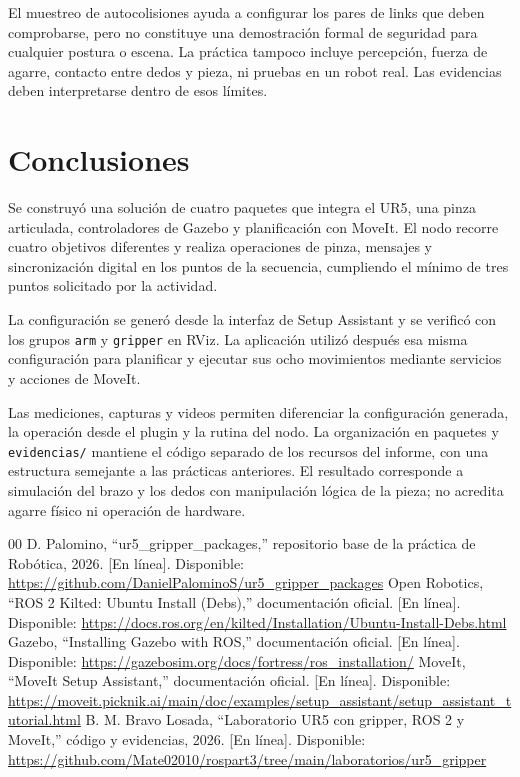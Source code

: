 \documentclass[conference]{IEEEtran}
\begin{document}
El muestreo de autocolisiones ayuda a configurar los pares de links
que deben comprobarse, pero no constituye una demostración formal
de seguridad para cualquier postura o escena. La práctica tampoco
incluye percepción, fuerza de agarre, contacto entre dedos y pieza,
ni pruebas en un robot real. Las evidencias deben interpretarse
dentro de esos límites.

\section{Conclusiones}
Se construyó una solución de cuatro paquetes que integra el UR5,
una pinza articulada, controladores de Gazebo y planificación con
MoveIt. El nodo recorre cuatro objetivos diferentes y realiza
operaciones de pinza, mensajes y sincronización digital en los
puntos de la secuencia, cumpliendo el mínimo de tres puntos
solicitado por la actividad.

La configuración se generó desde la interfaz de Setup Assistant
y se verificó con los grupos \texttt{arm} y \texttt{gripper} en RViz.
La aplicación utilizó después esa misma configuración para
planificar y ejecutar sus ocho movimientos mediante servicios
y acciones de MoveIt.

Las mediciones, capturas y videos permiten diferenciar la
configuración generada, la operación desde el plugin y la rutina
del nodo. La organización en paquetes y \texttt{evidencias/} mantiene
el código separado de los recursos del informe, con una estructura
semejante a las prácticas anteriores. El resultado corresponde
a simulación del brazo y los dedos con manipulación lógica de
la pieza; no acredita agarre físico ni operación de hardware.

\newpage
\begin{thebibliography}{00}
 D. Palomino, “ur5\_gripper\_packages,” repositorio
base de la práctica de Robótica, 2026. [En línea]. Disponible:
\url{https://github.com/DanielPalominoS/ur5_gripper_packages}
 Open Robotics, “ROS 2 Kilted: Ubuntu Install (Debs),”
documentación oficial. [En línea]. Disponible:
\url{https://docs.ros.org/en/kilted/Installation/Ubuntu-Install-Debs.html}
 Gazebo, “Installing Gazebo with ROS,” documentación
oficial. [En línea]. Disponible:
\url{https://gazebosim.org/docs/fortress/ros_installation/}
 MoveIt, “MoveIt Setup Assistant,” documentación
oficial. [En línea]. Disponible:
\url{https://moveit.picknik.ai/main/doc/examples/setup_assistant/setup_assistant_tutorial.html}
 B. M. Bravo Losada, “Laboratorio UR5 con gripper,
ROS 2 y MoveIt,” código y evidencias, 2026. [En línea]. Disponible:
\url{https://github.com/Mate02010/rospart3/tree/main/laboratorios/ur5_gripper}
\end{thebibliography}
\end{document}
